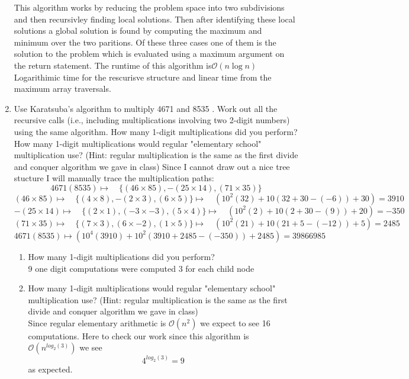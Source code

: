 \documentclass[11pt]{article}
\theoremstyle{definition}  %
\begin{document}
\begin{enumerate}
This algorithm works by reducing the problem space into two subdivisions and then recursivley finding local solutions. Then after identifying these local solutions a global solution is found by computing the maximum and minimum over the two paritions. Of these three cases one of them is the solution to the problem which is evaluated using a maximum argument on the return statement. The runtime of this algorithm is$\mathcal{O}(n\log n)$ Logarithimic time for the rescurisve structure and linear time from the maximum array traversals.
  \item Use Karatsuba's algorithm to multiply 4671 and 8535 . Work out all the recursive calls (i.e., including multiplications involving two 2-digit numbers) using the same algorithm. How many 1-digit multiplications did you perform? How many 1-digit multiplications would regular "elementary school" multiplication use? (Hint: regular multiplication is the same as the first divide and conquer algorithm we gave in class)
Since I cannot draw out a nice tree stucture I will manually trace the multiplication paths:
\[
  4671(8535)\mapsto \quad \{ (46\times 85),-(25\times 14),(71 \times 35)\}
\]
\[
  (46\times 85)\mapsto\quad \{(4\times 8),-(2\times3),(6\times 5)\}\mapsto\quad  (10^2(32)+10(32+30-(-6))+30)=3910
\]
\[
  -(25\times 14)\mapsto\quad \{(2\times 1),(-3\times -3),(5\times 4)\}\mapsto\quad  (10^2(2)+10(2+30-(9))+20)=-350
\]
\[
  (71 \times 35)\mapsto\quad \{(7\times 3),(6\times-2),(1\times5)\}\mapsto\quad  (10^2(21)+10(21+5-(-12))+5)=2485
\]
$$4671(8535)\mapsto (10^4(3910)+10^2(3910+2485-(-350))+2485)=39866985$$
\begin{enumerate}
  \item  How many 1-digit multiplications did you perform?\\ 9 one digit computations were computed 3 for each child node
  \item How many 1-digit multiplications would regular "elementary school" multiplication use? (Hint: regular multiplication is the same as the first divide and conquer algorithm we gave in class)\\Since regular elementary arithmetic is $\mathcal{O}(n^2)$ we expect to see 16 computations. Here to check our work since this algorithm is $\mathcal{O}(n^{log_2(3)})$ we see
  \[
    4^{log_2(3)}=9
  \]
  as expected. 
\end{enumerate}
\end{enumerate}
\end{document}
